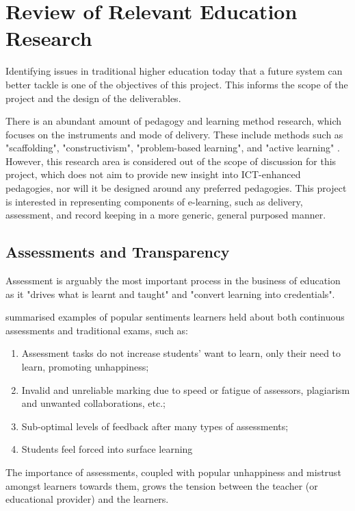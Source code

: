 \section{Review of Relevant Education Research}

Identifying issues in traditional higher education today that a future system can better 
tackle is one of the objectives of this project. This informs the scope of the 
project and the design of the deliverables.

There is an abundant amount of pedagogy and learning method research, which focuses on the 
instruments and mode of delivery. These include methods such as "scaffolding", "constructivism", 
"problem-based learning", and "active learning" \citep{ali2005effective}. However, this 
research area is considered out of the scope of discussion for this project, which does not 
aim to provide new insight into ICT-enhanced pedagogies, nor will it be designed around any 
preferred pedagogies. This project is interested in representing components of e-learning, 
such as delivery, assessment, and record keeping in a more generic, general purposed manner.

\subsection{Assessments and Transparency}

Assessment is arguably the most important process in the business of education as it "drives what 
is learnt and taught" and "convert learning into credentials". \citep[p.160]{campbell2010digital}

\citet{brown1999assessment} summarised examples of popular sentiments learners held about both 
continuous assessments and traditional exams, such as:

\begin{enumerate}
    \item Assessment tasks do not increase students' want to learn, only their need to learn, promoting unhappiness;
    \item Invalid and unreliable marking due to speed or fatigue of assessors, plagiarism and unwanted collaborations, etc.;
    \item Sub-optimal levels of feedback after many types of assessments;
    \item Students feel forced into surface learning
    \citep[p.62-65]{brown1999assessment}
\end{enumerate}

The importance of assessments, coupled with popular unhappiness and mistrust amongst learners towards 
them, grows the tension between the teacher (or educational provider) and the learners.

